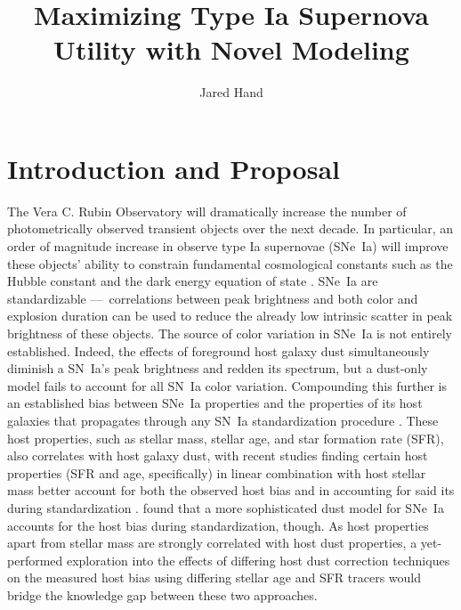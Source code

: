 \documentclass[modern]{aastex63}
\begin{document}
\title{Maximizing Type Ia Supernova Utility with Novel Modeling}

\author{Jared Hand}

\section{Introduction and Proposal}
The Vera C. Rubin Observatory will dramatically increase the number of photometrically observed transient objects over the next decade. 
In particular, an order of magnitude increase in observe type Ia supernovae (SNe~Ia) will improve these objects' ability to constrain fundamental cosmological constants such as the Hubble constant and the dark energy equation of state \citep{Perlmutter1999}.  SNe~Ia are standardizable ---~correlations between peak brightness and both color and explosion duration can be used to reduce the already low intrinsic scatter in peak brightness of these objects.  
The source of color variation in SNe~Ia is not entirely established.  
Indeed, the effects of foreground host galaxy dust simultaneously diminish a SN~Ia's peak brightness and redden its spectrum, but a dust-only model fails to account for all SN~Ia color variation.  
Compounding this further is an established bias between SNe~Ia properties and the properties of its host galaxies that propagates through any SN~Ia standardization procedure \citep{Rigault2018,Sullivan2010}. 
These host properties, such as stellar mass, stellar age, and star formation rate (SFR), also correlates with host galaxy dust, with recent studies finding certain host properties (SFR and age, specifically) in linear combination with host stellar mass better account for both the observed host bias and in accounting for said its during standardization \citep{Rigault2018,Rose2021}. 
\cite{Brout2021} found that a more sophisticated dust model for SNe~Ia accounts for the host bias during standardization, though.
As host properties apart from stellar mass are strongly correlated with host dust properties, a yet-performed exploration into the effects of differing host dust correction techniques on the measured host bias using differing stellar age and SFR tracers would bridge the knowledge gap between these two approaches. 
\end{document}
